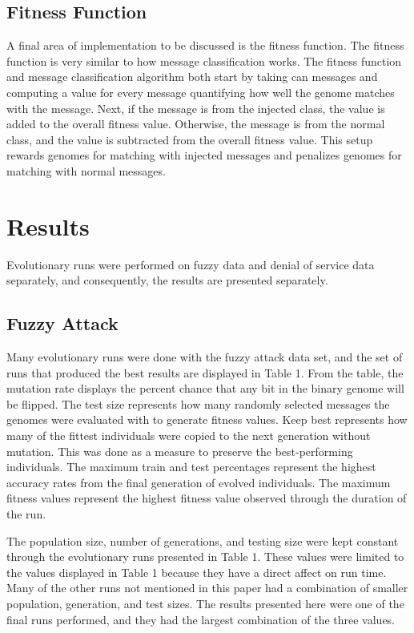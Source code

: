 \documentclass[10pt,conference]{IEEEtran}
\begin{document}
\subsection{Fitness Function}

A final area of implementation to be discussed is the fitness function.  The fitness function is very similar to how message classification works.  The fitness function and message classification algorithm both start by taking can messages and computing a value for every message quantifying how well the genome matches with the message.  Next, if the message is from the injected class, the value is added to the overall fitness value.  Otherwise, the message is from the normal class, and the value is subtracted from the overall fitness value.  This setup rewards genomes for matching with injected messages and penalizes genomes for matching with normal messages. 

\section{Results}

Evolutionary runs were performed on fuzzy data and denial of service data separately, and consequently, the results are presented separately.  

\subsection{Fuzzy Attack}

Many evolutionary runs were done with the fuzzy attack data set, and the set of runs that produced the best results are displayed in Table 1.  From the table, the mutation rate displays the percent chance that any bit in the binary genome will be flipped.  The test size represents how many randomly selected messages the genomes were evaluated with to generate fitness values.  Keep best represents how many of the fittest individuals were copied to the next generation without mutation.  This was done as a measure to preserve the best-performing individuals.  The maximum train and test percentages represent the highest accuracy rates from the final generation of evolved individuals.  The maximum fitness values represent the highest fitness value observed through the duration of the run.  

The population size, number of generations, and testing size were kept constant through the evolutionary runs presented in Table 1.  These values were limited to the values displayed in Table 1 because they have a direct affect on run time.  Many of the other runs not mentioned in this paper had a combination of smaller population, generation, and test sizes. The results presented here were one of the final runs performed, and they had the largest combination of the three values.  
\end{document}
